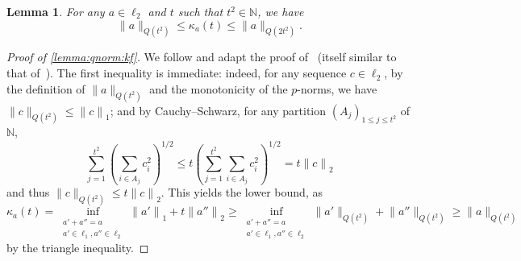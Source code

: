 \documentclass[11pt]{article}
\newtheorem{lemma}[lem]{Lemma}
\theoremstyle{remark}   	\newtheorem{remark}[theorem]{Remark}
\theoremstyle{definition}   	\newaliascnt{defn}{theorem}
\newenvironment{proofof}[1]{\begin{proof}[Proof of {#1}]}{\end{proof}}
\newcommand{\norm}[1]{\lVert#1{\rVert}}
\newcommand{\normone}[1]{{\norm{#1}}_1}
\newcommand{\normtwo}[1]{{\norm{#1}}_2}
\newcommand{\N}{\ensuremath{\mathbb{N}}\xspace}
\newcommand{\lp}[1][1]{\ell_{#1}}
\newcommand{\kf}[1]{\kappa_{#1}}
\begin{document}
\begin{lemma}\label{lemma:qnorm:kf}
  For any $a\in\lp[2]$ and $t$ such that $t^2\in\N$, we have
  \begin{equation}\label{eq:qnorm:kf}
    \norm{a}_{Q(t^2)} \leq \kf{a}(t) \leq \norm{a}_{Q(2t^2)}.
  \end{equation}
\end{lemma}
\begin{proofof}{\autoref{lemma:qnorm:kf}}
  We follow and adapt the proof of~\cite[Lemma 2.2]{Astashkin:2010} (itself similar to that of~\cite[Lemma 2]{MS:90}). The first inequality is immediate: indeed, for any sequence $c\in\lp[2]$,
  by the definition of $\norm{a}_{Q(t^2)}$ and the monotonicity of the $p$-norms, we have $\norm{c}_{Q(t^2)} \leq \normone{c}$; and by Cauchy--Schwarz, for any partition $(A_j)_{1\leq j\leq t^2}$ of $\N$,
  \[
      \sum_{j=1}^{t^2} \left( \sum_{i\in A_j} c_i^2 \right)^{1/2} 
      \leq t\left( \sum_{j=1}^{t^2} \sum_{i\in A_j} c_i^2 \right)^{1/2} = t\normtwo{c}
  \]
  and thus $\norm{c}_{Q(t^2)} \leq t\normtwo{c}$. This yields the lower bound, as
  \[
      \kf{a}(t) = \inf_{\substack{a'+a''=a\\a'\in\lp[1],a''\in\lp[2]}} \normone{a'}+t\normtwo{a''} \geq 
      \inf_{\substack{a'+a''=a\\a'\in\lp[1],a''\in\lp[2]}} \norm{a'}_{Q(t^2)}+\norm{a''}_{Q(t^2)}
      \geq \norm{a}_{Q(t^2)}
  \]
  by the triangle inequality.
  

\end{proofof}
\end{document}
